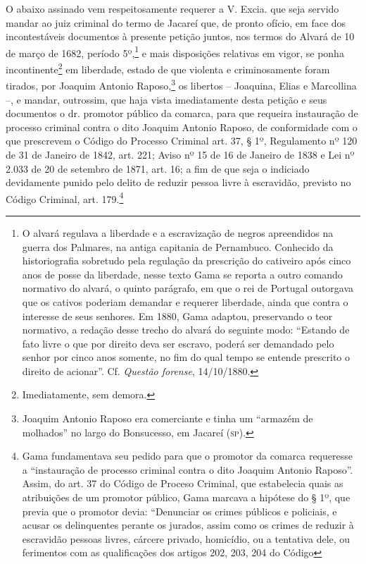{\begin{flushright}
O abaixo assinado vem respeitosamente requerer a V. Excia. que seja
servido mandar ao juiz criminal do termo de Jacareí que, de pronto
ofício, em face dos incontestáveis documentos à presente petição juntos,
nos termos do Alvará de 10 de março de 1682, período 5º,\footnote{ O
  alvará regulava a liberdade e a escravização de negros apreendidos na
  guerra dos Palmares, na antiga capitania de Pernambuco. Conhecido da
  historiografia sobretudo pela regulação da prescrição do cativeiro
  após cinco anos de posse da liberdade, nesse texto Gama se reporta a
  outro comando normativo do alvará, o quinto parágrafo, em que o rei de
  Portugal outorgava que os cativos poderiam demandar e requerer
  liberdade, ainda que contra o interesse de seus senhores. Em 1880,
  Gama adaptou, preservando o teor normativo, a redação desse trecho do
  alvará do seguinte modo: ``Estando de fato livre o que por direito deva
  ser escravo, poderá ser demandado pelo senhor por cinco anos somente,
  no fim do qual tempo se entende prescrito o direito de acionar''. Cf.
  \emph{Questão forense}, 14/10/1880.} e mais disposições relativas em
vigor, se ponha incontinente\footnote{ Imediatamente, sem demora.} em
liberdade, estado de que violenta e criminosamente foram tirados, por
Joaquim Antonio Raposo,\footnote{ Joaquim Antonio Raposo era
  comerciante e tinha um ``armazém de molhados'' no largo do Bonsucesso,
  em Jacareí (\textsc{sp}).} os libertos -- Joaquina, Elias e Marcollina --, e
mandar, outrossim, que haja vista imediatamente desta petição e seus
documentos o dr. promotor público da comarca, para que requeira
instauração de processo criminal contra o dito Joaquim Antonio Raposo,
de conformidade com o que prescrevem o Código do Processo Criminal art.
37, § 1º, Regulamento nº 120 de 31 de Janeiro de 1842, art. 221; Aviso
nº 15 de 16 de Janeiro de 1838 e Lei nº 2.033 de 20 de setembro de 1871,
art. 16; a fim de que seja o indiciado devidamente punido pelo delito de
reduzir pessoa livre à escravidão, previsto no Código Criminal, art.
179.\footnote{Gama fundamentava seu pedido para que o promotor da
  comarca requeresse a ``instauração de processo criminal contra o dito
  Joaquim Antonio Raposo''. Assim, do art. 37 do Código de Proceso
  Criminal, que estabelecia quais as atribuições de um promotor público,
  Gama marcava a hipótese do § 1º, que previa que o promotor devia:
  ``Denunciar os crimes públicos e policiais, e acusar os delinquentes
  perante os jurados, assim como os crimes de reduzir à escravidão
  pessoas livres, cárcere privado, homicídio, ou a tentativa dele, ou
  ferimentos com as qualificações dos artigos 202, 203, 204 do Código
}
\end{flushright}}

